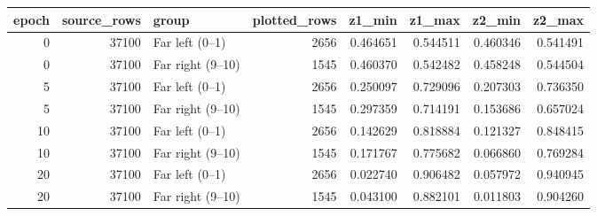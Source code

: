 \begin{tabular}{rrlrrrrr}
\toprule
epoch & source\_rows & group & plotted\_rows & z1\_min & z1\_max & z2\_min & z2\_max \\
\midrule
0 & 37100 & Far left (0–1) & 2656 & 0.464651 & 0.544511 & 0.460346 & 0.541491 \\
0 & 37100 & Far right (9–10) & 1545 & 0.460370 & 0.542482 & 0.458248 & 0.544504 \\
5 & 37100 & Far left (0–1) & 2656 & 0.250097 & 0.729096 & 0.207303 & 0.736350 \\
5 & 37100 & Far right (9–10) & 1545 & 0.297359 & 0.714191 & 0.153686 & 0.657024 \\
10 & 37100 & Far left (0–1) & 2656 & 0.142629 & 0.818884 & 0.121327 & 0.848415 \\
10 & 37100 & Far right (9–10) & 1545 & 0.171767 & 0.775682 & 0.066860 & 0.769284 \\
20 & 37100 & Far left (0–1) & 2656 & 0.022740 & 0.906482 & 0.057972 & 0.940945 \\
20 & 37100 & Far right (9–10) & 1545 & 0.043100 & 0.882101 & 0.011803 & 0.904260 \\
\bottomrule
\end{tabular}
